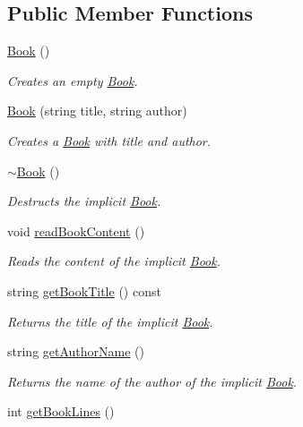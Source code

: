 \subsection*{Public Member Functions}
\begin{DoxyCompactItemize}
\item 
\hyperlink{class_book_a2eac9e235a08763158f78533f7a83e1f}{Book} ()
\begin{DoxyCompactList}\small\item\em Creates an empty \hyperlink{class_book}{Book}. \end{DoxyCompactList}\item 
\hyperlink{class_book_a98dad89c9f945e0d846c81ce7e459fbc}{Book} (string title, string author)
\begin{DoxyCompactList}\small\item\em Creates a \hyperlink{class_book}{Book} with title and author. \end{DoxyCompactList}\item 
\hyperlink{class_book_a0ba8eceb34ea1301bc08942e37824767}{$\sim$\-Book} ()
\begin{DoxyCompactList}\small\item\em Destructs the implicit \hyperlink{class_book}{Book}. \end{DoxyCompactList}\item 
void \hyperlink{class_book_a3e62d70f19bf6fa8ebef5556882b3ed7}{read\-Book\-Content} ()
\begin{DoxyCompactList}\small\item\em Reads the content of the implicit \hyperlink{class_book}{Book}. \end{DoxyCompactList}\item 
string \hyperlink{class_book_aae6e165b712f111beb53574cd2f53776}{get\-Book\-Title} () const 
\begin{DoxyCompactList}\small\item\em Returns the title of the implicit \hyperlink{class_book}{Book}. \end{DoxyCompactList}\item 
string \hyperlink{class_book_a651503f226fbf2c9c050f9527a3b983e}{get\-Author\-Name} ()
\begin{DoxyCompactList}\small\item\em Returns the name of the author of the implicit \hyperlink{class_book}{Book}. \end{DoxyCompactList}\item 
int \hyperlink{class_book_a8f241d57fb5525e3008b3f3d6ba81291}{get\-Book\-Lines} ()

\end{DoxyCompactItemize}
